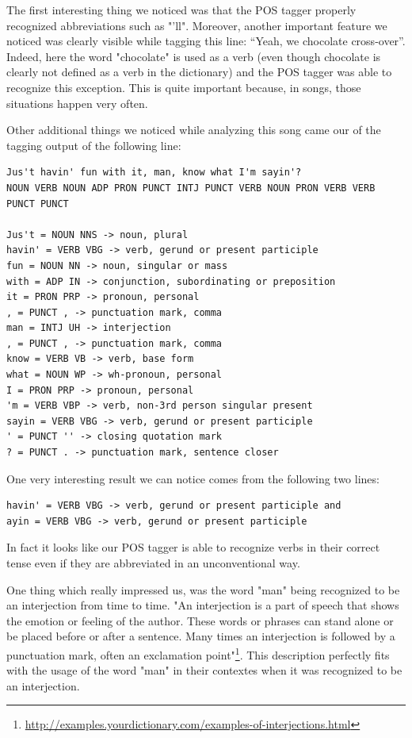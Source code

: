 The first interesting thing we noticed was that the POS tagger properly recognized abbreviations such as "'ll".
Moreover, another important feature we noticed was clearly visible while tagging this line: ``Yeah, we chocolate cross-over''.
Indeed, here the word "chocolate" is used as a verb (even though chocolate is clearly not defined as a verb in 
the dictionary) and the POS tagger was able to recognize this exception. 
This is quite important because, in songs, those situations happen very often.

Other additional things we noticed while analyzing this song came our of the tagging output of the following line:

\begin{lstlisting}
Jus't havin' fun with it, man, know what I'm sayin'?
NOUN VERB NOUN ADP PRON PUNCT INTJ PUNCT VERB NOUN PRON VERB VERB PUNCT PUNCT 

Jus't = NOUN NNS -> noun, plural
havin' = VERB VBG -> verb, gerund or present participle
fun = NOUN NN -> noun, singular or mass
with = ADP IN -> conjunction, subordinating or preposition
it = PRON PRP -> pronoun, personal
, = PUNCT , -> punctuation mark, comma
man = INTJ UH -> interjection
, = PUNCT , -> punctuation mark, comma
know = VERB VB -> verb, base form
what = NOUN WP -> wh-pronoun, personal
I = PRON PRP -> pronoun, personal
'm = VERB VBP -> verb, non-3rd person singular present
sayin = VERB VBG -> verb, gerund or present participle
' = PUNCT '' -> closing quotation mark
? = PUNCT . -> punctuation mark, sentence closer
\end{lstlisting}

One very interesting result we can notice comes from the following two lines:
\begin{lstlisting}
havin' = VERB VBG -> verb, gerund or present participle and
ayin = VERB VBG -> verb, gerund or present participle
\end{lstlisting}

In fact it looks like our POS tagger is able to recognize verbs in their correct tense
even if they are abbreviated in an unconventional way.

One thing which really impressed us, was the word "man" being recognized to be an interjection from time to time. 
"An interjection is a part of speech that shows the emotion or feeling of the author. These words or phrases can 
stand alone or be placed before or after a sentence. Many times an interjection is followed 
by a punctuation mark, often an exclamation point"\footnote{\url{http://examples.yourdictionary.com/examples-of-interjections.html}}. 
This description perfectly fits with the usage of the word "man" in their contextes when it was recognized to be an interjection. 

